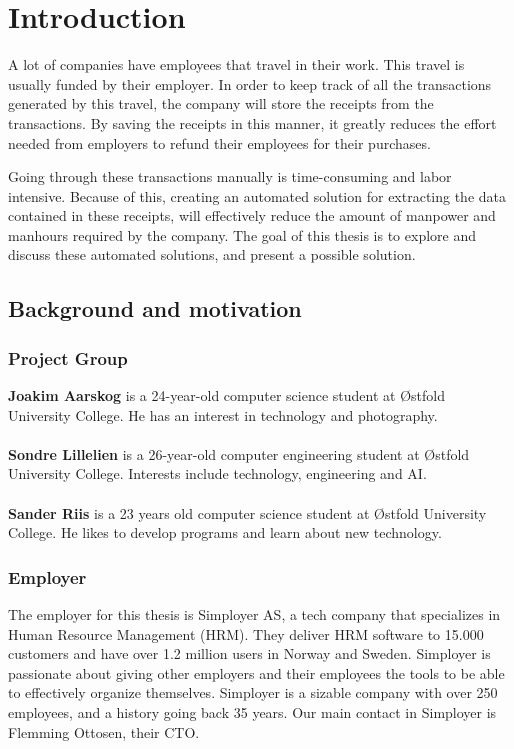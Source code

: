 \chapter{Introduction}
\label{ch:intro}
A lot of companies have employees that travel in their work.
This travel is usually funded by their employer.
In order to keep track of all the transactions generated by this travel, the company will store the receipts from the
transactions.
By saving the receipts in this manner, it greatly reduces the effort needed from employers to refund their employees
for their purchases.

Going through these transactions manually is time-consuming and labor intensive.
Because of this, creating an automated solution for extracting the data contained in these receipts, will effectively
reduce the amount of manpower and manhours required by the company.
The goal of this thesis is to explore and discuss these automated solutions, and present a possible solution.

\section{Background and motivation}\label{sec:background-and-motivation}
\subsection{Project Group}\label{subsec:project-group}
\textbf{Joakim Aarskog} is a 24-year-old computer science student at Østfold University College.
He has an interest in technology and photography.\\
\\
\textbf{Sondre Lillelien} is a 26-year-old computer engineering student at Østfold University College.
Interests include technology, engineering and AI.\\
\\
\textbf{Sander Riis} is a 23 years old computer science student at Østfold University College.
He likes to develop programs and learn about new technology.

\subsection{Employer}\label{subsec:employer}
The employer for this thesis is Simployer AS, a tech company that specializes in Human Resource Management (HRM).
They deliver HRM software to 15.000 customers and have over 1.2 million users in Norway and Sweden.
Simployer is passionate about giving other employers and their employees the tools to be able to effectively organize themselves.
Simployer is a sizable company with over 250 employees, and a history going back 35 years.
Our main contact in Simployer is Flemming Ottosen, their CTO.

